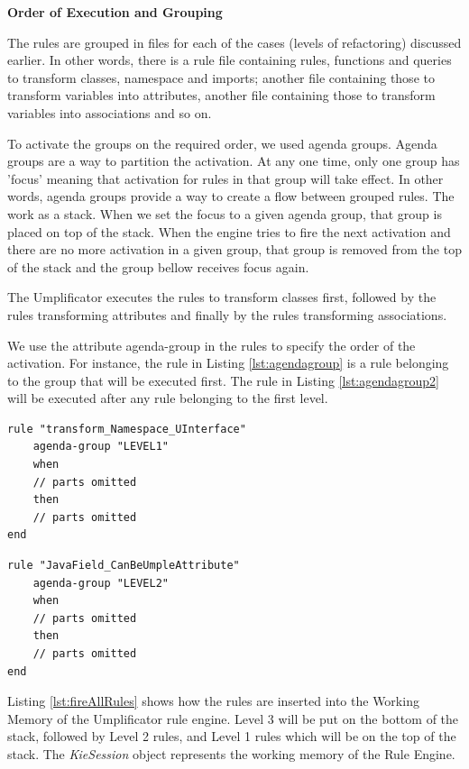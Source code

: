 \textbf{Order of Execution and Grouping}

The rules are grouped in files for each of the cases (levels of refactoring) discussed earlier. In other words, there is a rule file containing rules, functions and queries to transform classes, namespace and imports; another file containing those to transform variables into attributes, another file containing those to transform variables into associations and so on.

To activate the groups on the required order, we used agenda groups. Agenda groups are a way to partition the activation. At any one time, only one group has 'focus' meaning that activation for rules in that group will take effect. 
In other words, agenda groups provide a way to create a flow between grouped rules. The work as a stack. When we set the focus to a given agenda group, that group is placed on top of the stack. When the engine tries to fire the next activation and there are no more activation in a given group, that group is removed from the top of the stack and the group bellow receives focus again.

The Umplificator executes the rules to transform classes first, followed by the rules transforming attributes and finally by the rules transforming associations. 

We use the attribute agenda-group in the rules to specify the order of the activation. For instance, the rule in Listing \ref{lst:agendagroup} is a rule belonging to the group that will be executed first. The rule in Listing \ref{lst:agendagroup2} will be executed after any rule belonging to the first level. 

\begin{lstlisting}[language={drools},label={lst:agendagroup}, caption=A rule belonging to Level 1] 
rule "transform_Namespace_UInterface"
	agenda-group "LEVEL1" 
	when
	// parts omitted
	then
	// parts omitted
end
\end{lstlisting}

\begin{lstlisting}[language={drools},label={lst:agendagroup2}, caption=A rule belonging to Level 2] 
rule "JavaField_CanBeUmpleAttribute"
	agenda-group "LEVEL2" 
	when
	// parts omitted
	then
	// parts omitted
end
\end{lstlisting}

Listing \ref{lst:fireAllRules} shows how the rules are inserted into the Working Memory of the Umplificator rule engine. Level 3 will be put on the bottom of the stack, followed by Level 2 rules, and Level 1 rules which will be on the top of the stack. The \textit{KieSession} object represents the working memory of the Rule Engine.

